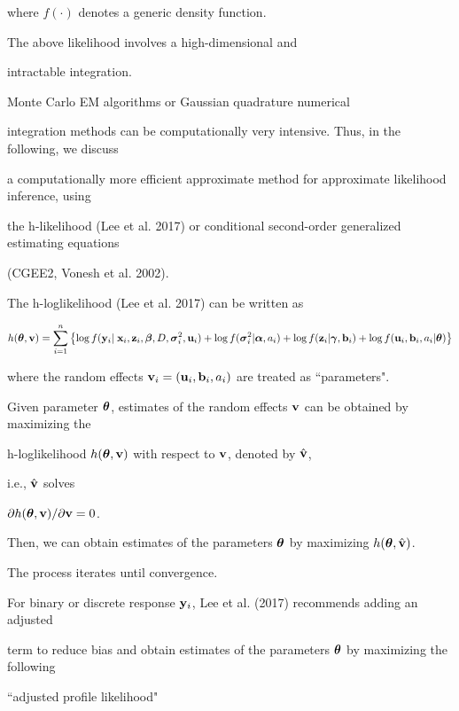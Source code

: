 \documentclass[12pt]{article}
\newcommand{\btheta}{\mbox{\boldmath $\theta$}}
\newcommand{\balpha}{\mbox{\boldmath $\alpha$}}
\newcommand{\bgamma}{\mbox{\boldmath $\gamma$}}
\newcommand{\bbeta}{\mbox{\boldmath $\beta$}}
\newcommand{\bsigma}{\mbox{\boldmath $\sigma$}}
\begin{document}
where $f(\cdot)$ denotes a generic density function. 

The above likelihood involves a high-dimensional and 

intractable integration.

Monte Carlo EM algorithms or Gaussian quadrature numerical 

integration methods can be computationally very intensive. Thus, in the following, we discuss 

a computationally more efficient  approximate method  for approximate likelihood inference, using  

the h-likelihood (Lee et al. 2017) or conditional second-order generalized estimating equations 

(CGEE2, Vonesh et al. 2002). 





   The {h-loglikelihood} (Lee et al. 2017) can be written as 

$$ h(\btheta, {\bf v}) = \sum_{i=1}^n \left\{\log f({\bf y}_i | \; {\bf x}_i, {\bf z}_i,

  \bbeta, D, \bsigma^2_{i}, {\bf u}_i) + 

  \log f(\bsigma^2_{i} | \balpha, a_i) + \log f({\bf z}_i | \bgamma, {\bf b}_i) 

  + \log f({\bf u}_i, {\bf b}_i, a_i |\btheta)\right\}  $$

where the random effects ${\bf v}_i = ({\bf u}_i, {\bf b}_i, a_i)$ are treated as ``parameters". 

Given parameter $\btheta$, estimates of the random effects ${\bf v}$ can be obtained by maximizing the 

h-loglikelihood $h(\btheta, {\bf v})$ with respect to ${\bf v}$, denoted by $\hat{\bf v}$, 

i.e., $\hat{\bf v}$ solves

$\partial h(\btheta, {\bf v})/\partial{\bf v}=0$. 

Then, we can obtain estimates of the parameters $\btheta$ by maximizing $h(\btheta, \hat{\bf v})$. 

The process iterates until convergence. 

For binary or discrete response ${\bf y}_i$, Lee et al. (2017) recommends adding an adjusted 

term to reduce bias and obtain estimates of the parameters $\btheta$ by maximizing the following 

``adjusted profile likelihood"
\end{document}
